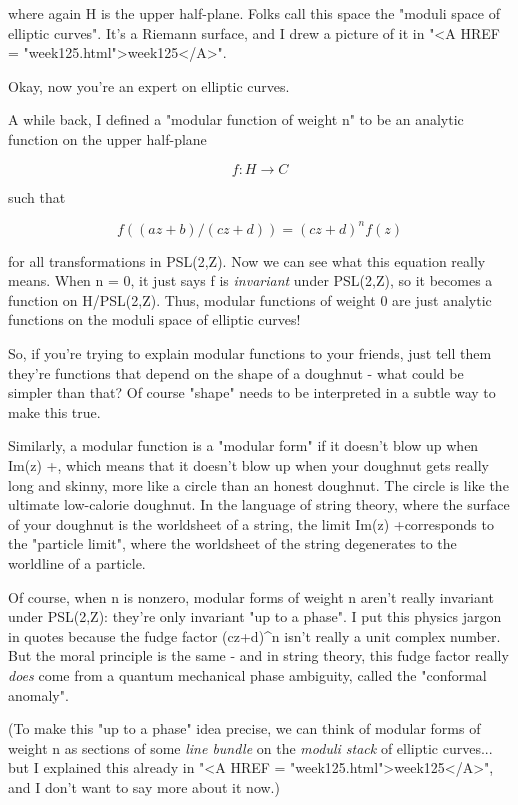 where again H is the upper half-plane.  Folks call this
space the "moduli space of elliptic curves".  It's a Riemann 
surface, and I drew a picture of 
it in "<A HREF = "week125.html">week125</A>".

Okay, now you're an expert on elliptic curves.

A while back, I defined a "modular function of weight n" to be an 
analytic function on the upper half-plane

$$
f: H \to  C                  
$$
    
such that

$$
f((az+b)/(cz+d)) = (cz+d)^{n} f(z)
$$
    
for all transformations in PSL(2,Z).  Now we can see what
this equation really means.  When n = 0, it just says f is 
\emph{invariant} under PSL(2,Z), so it becomes a function on H/PSL(2,Z).
Thus, modular functions of weight 0 are just analytic functions 
on the moduli space of elliptic curves!  

So, if you're trying to explain modular functions to your friends,
just tell them they're functions that depend on the shape of a 
doughnut - what could be simpler than that?  Of course "shape"
needs to be interpreted in a subtle way to make this true.

Similarly, a modular function is a "modular form" if it doesn't 
blow up when Im(z) \to  +\infty , which means that it doesn't 
blow up when your doughnut gets really long and skinny, more
like a circle than an honest doughnut.   The 
circle is like the ultimate low-calorie doughnut.  In the language of 
string theory, where the surface of your doughnut is the worldsheet 
of a string, the limit Im(z) \to  +\infty  corresponds to 
the "particle limit", where 
the worldsheet of the string degenerates to the worldline of a particle.

Of course, when n is nonzero, modular forms of weight n aren't 
really invariant under PSL(2,Z): they're only invariant "up to 
a phase".  I put this physics jargon in quotes because the fudge 
factor (cz+d)^{n} isn't really a unit complex number.  But the moral 
principle is the same - and in string theory, this fudge factor 
really \emph{does} come from a quantum mechanical phase ambiguity, 
called the "conformal anomaly".  

(To make this "up to a phase" idea precise, we can think of 
modular forms of weight n as sections of some \emph{line bundle} 
on the \emph{moduli stack} of elliptic curves... but I explained this
already in "<A HREF = "week125.html">week125</A>", and I don't 
want to say more about it now.)

